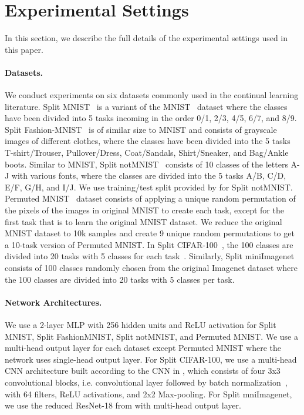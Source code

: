 
\section{Experimental Settings}\label{app:experimental_settings}

In this section, we describe the full details of the experimental settings used in this paper. 

\vspace{-2mm}
\paragraph{Datasets.}
We conduct experiments on six datasets commonly used in the continual learning literature. Split MNIST~\citep{zenke2017continual} is a variant of the MNIST~\citep{lecun1998gradient} dataset where the classes have been divided into 5 tasks incoming in the order 0/1, 2/3, 4/5, 6/7, and 8/9. Split Fashion-MNIST~\citep{xiao2017fashion} is of similar size to MNIST and consists of grayscale images of different clothes, where the classes have been divided into the 5 tasks T-shirt/Trouser, Pullover/Dress, Coat/Sandals, Shirt/Sneaker, and Bag/Ankle boots. Similar to MNIST, Split notMNIST~\citep{bulatov2011notMNIST} consists of 10 classes of the letters A-J with various fonts, where the classes are divided into the 5 tasks A/B, C/D, E/F, G/H, and I/J. We use training/test split provided by \citet{ebrahimi2020adversarial} for Split notMNIST. Permuted MNIST~\cite{goodfellow2013empirical} dataset consists of applying a unique random permutation of the pixels of the images in original MNIST to create each task, except for the first task that is to learn the original MNIST dataset. We reduce the original MNIST dataset to 10k samples and create 9 unique random permutations to get a 10-task version of Permuted MNIST. In Split CIFAR-100~\citep{krizhevsky2009learning}, the 100 classes are divided into 20 tasks with 5 classes for each task~\citep{lopez2017gradient, rebuffi2017icarl}. Similarly, Split miniImagenet~\cite{vinyals2016matching} consists of 100 classes randomly chosen from the original Imagenet dataset where the 100 classes are divided into 20 tasks with 5 classes per task.

\vspace{-2mm}
\paragraph{Network Architectures.} We use a 2-layer MLP with 256 hidden units and ReLU activation for Split MNIST, Split FashionMNIST, Split notMNIST, and Permuted MNIST. We use a multi-head output layer for each dataset except Permuted MNIST where the network uses single-head output layer. For Split CIFAR-100, we use a multi-head CNN architecture built according to the CNN in \citep{adel2019continual, schwarz2018progress, vinyals2016matching}, which consists of four 3x3 convolutional blocks, i.e. convolutional layer followed by batch normalization~\citep{ioffe2015batch}, with 64 filters, ReLU activations, and 2x2 Max-pooling. For Split mniImagenet, we use the reduced ResNet-18 from \citet{lopez2017gradient} with multi-head output layer. 

